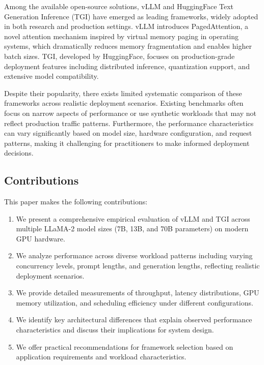 \documentclass{article}
\begin{document}
Among the available open-source solutions, vLLM \cite{kwon2023efficient} and HuggingFace Text Generation Inference (TGI) \cite{huggingface2023tgi} have emerged as leading frameworks, widely adopted in both research and production settings. vLLM introduces PagedAttention, a novel attention mechanism inspired by virtual memory paging in operating systems, which dramatically reduces memory fragmentation and enables higher batch sizes. TGI, developed by HuggingFace, focuses on production-grade deployment features including distributed inference, quantization support, and extensive model compatibility.

Despite their popularity, there exists limited systematic comparison of these frameworks across realistic deployment scenarios. Existing benchmarks often focus on narrow aspects of performance or use synthetic workloads that may not reflect production traffic patterns. Furthermore, the performance characteristics can vary significantly based on model size, hardware configuration, and request patterns, making it challenging for practitioners to make informed deployment decisions.

\subsection{Contributions}

This paper makes the following contributions:

\begin{enumerate}
    \item We present a comprehensive empirical evaluation of vLLM and TGI across multiple LLaMA-2 model sizes (7B, 13B, and 70B parameters) on modern GPU hardware.
    
    \item We analyze performance across diverse workload patterns including varying concurrency levels, prompt lengths, and generation lengths, reflecting realistic deployment scenarios.
    
    \item We provide detailed measurements of throughput, latency distributions, GPU memory utilization, and scheduling efficiency under different configurations.
    
    \item We identify key architectural differences that explain observed performance characteristics and discuss their implications for system design.
    
    \item We offer practical recommendations for framework selection based on application requirements and workload characteristics.
\end{enumerate}
\end{document}
